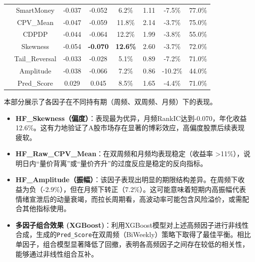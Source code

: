 \documentclass[10pt,compsoc,UTF8]{CjC}
\begin{document}
\begin{table}[!h]
\begin{tabular}{|l|c|cccccc|}
\rowcolor{rowgray}
& SmartMoney & -0.037 & -0.052 & 6.2\% & 1.11 & -7.5\% & 77.0\% \\ 
\rowcolor{rowgray}
& CPV\_Mean & -0.047 & -0.059 & 11.8\% & 2.14 & -3.7\% & 75.0\% \\ 
\rowcolor{rowgray}
& CDPDP & -0.044 & -0.064 & 12.2\% & 1.99 & -3.8\% & 55.0\% \\ 
\rowcolor{rowgray}
& Skewness & -0.054 & \textbf{-0.070} & \textbf{12.6\%} & 2.60 & -3.7\% & 72.0\% \\ 
\rowcolor{rowgray}
& Tail\_Reversal & -0.033 & -0.028 & 5.1\% & 0.89 & -7.2\% & 71.0\% \\ 
\rowcolor{rowgray}
& Amplitude & -0.038 & -0.066 & 7.2\% & 0.86 & -10.2\% & 44.0\% \\ 
\rowcolor{rowgray}
\multirow{-7}{*}{\textbf{Monthly}} & Pred\_Score & 0.029 & 0.045 & 8.5\% & 1.65 & -4.4\% & 71.0\% \\ \hline
\end{tabular}
\end{table}
\newpage
本部分展示了各因子在不同持有期（周频、双周频、月频）下的表现。
\begin{itemize}
    \item \textbf{HF\_Skewness（偏度）}：表现最为优异，月频RankIC达到-0.070，年化收益12.6\%。这有力地验证了A股市场存在显著的博彩效应，高偏度股票后续表现疲软。
    \item \textbf{HF\_Raw\_CPV\_Mean}：在双周频和月频均表现稳定（收益率 >11\%），说明日内“量价背离”或“量价齐升”的过度反应是稳定的反向指标。
    \item \textbf{HF\_Amplitude（振幅）}：该因子表现出明显的期限结构差异。在周频下收益为负（-2.9\%），但在月频下转正（7.2\%）。这可能意味着短期内高振幅代表情绪宣泄后的动量衰竭，而拉长周期看，高波动率可能包含风险溢价，或需配合其他指标使用。
    \item \textbf{多因子组合效果 (XGBoost)}：利用XGBoost模型对上述高频因子进行非线性合成，生成的\texttt{Pred\_Score}在双周频（BiWeekly）策略下取得了最佳平衡。相比单因子，组合模型显著降低了回撤，表明各高频因子之间存在较低的相关性，能够通过非线性组合互补。
\end{itemize}
\end{document}
